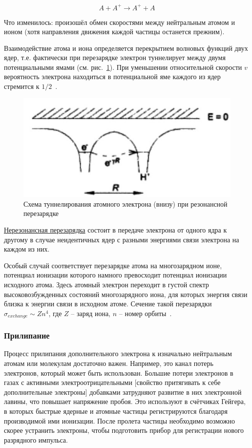 \documentclass[10pt, a4paper]{article}
\begin{document}
\begin{equation*}
	A + A^{+} \rightarrow A^{+} + A
\end{equation*}

Что изменилось: произошёл обмен скоростями между нейтральным атомом и ионом (хотя направления движения каждой частицы останется прежним).

Взаимодействие атома и иона определяется перекрытием волновых функций двух ядер, т.е. фактически при перезарядке электрон туннелирует между двумя потенциальными ямами (см. рис.~\ref{fig:charge_exchange}). При уменьшении относительной скорости $v$ вероятность электрона находиться в потенциальной яме каждого из ядер стремится к $1/2$~\cite{astap}.

\begin{figure}[ht]
	\begin{center}
		\includegraphics[width=0.5\linewidth]{res_recharge.jpg}
	\end{center}
	\caption{Схема туннелирования атомного электрона (внизу) при резонансной перезарядке}
	\label{fig:charge_exchange}
\end{figure}

\uline{Нерезонансная перезарядка} состоит в передаче электрона от одного ядра к другому в случае неидентичных ядер с разными энергиями связи электрона на каждом из них.

Особый случай соответствует перезарядке атома на многозарядном ионе, потенциал ионизации которого намного превосходит потенциал ионизации исходного атома. Здесь атомный электрон переходит в густой спектр высоковозбужденных состояний многозарядного иона, для которых энергия связи близка к энергии связи в исходном атоме. Сечение такой перезарядки $\sigma_{exchange} \sim Zn^4$, где $Z$ -- заряд иона, $n$ -- номер орбиты~\cite{astap}.

\subsubsection{Прилипание}

Процесс прилипания дополнительного электрона к изначально нейтральным атомам или молекулам достаточно важен. Например, это канал потерь электронов, который может быть использован. Большие потери электронов в газах с активными электроотрицательными [свойство притягивать к себе дополнительные электроны] добавками затрудняют развитие в них электронной лавины, что повышает напряжение пробоя. Это используют в счётчиках Гейгера, в которых быстрые ядерные и атомные частицы регистрируются благодаря производимой ими ионизации. После пролета частицы необходимо возможно скорее устранить электроны, чтобы подготовить прибор для регистрации нового разрядного импульса.
 
\end{document}
